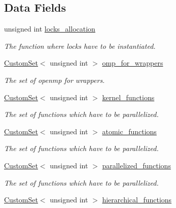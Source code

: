 \subsection*{Data Fields}
\begin{DoxyCompactItemize}
\item 
unsigned int \hyperlink{classOmpFunctions_a51202abb9e5888fbbbfe347b379e2e6a}{locks\+\_\+allocation}
\begin{DoxyCompactList}\small\item\em The function where locks have to be instantiated. \end{DoxyCompactList}\item 
\hyperlink{custom__set_8hpp_a615bc2f42fc38a4bb1790d12c759e86f}{Custom\+Set}$<$ unsigned int $>$ \hyperlink{classOmpFunctions_a17e7935fd31530460b887a825beea191}{omp\+\_\+for\+\_\+wrappers}
\begin{DoxyCompactList}\small\item\em The set of openmp for wrappers. \end{DoxyCompactList}\item 
\hyperlink{custom__set_8hpp_a615bc2f42fc38a4bb1790d12c759e86f}{Custom\+Set}$<$ unsigned int $>$ \hyperlink{classOmpFunctions_a2ed2c022afbba84efd566b61849b1e16}{kernel\+\_\+functions}
\begin{DoxyCompactList}\small\item\em The set of functions which have to be parallelized. \end{DoxyCompactList}\item 
\hyperlink{custom__set_8hpp_a615bc2f42fc38a4bb1790d12c759e86f}{Custom\+Set}$<$ unsigned int $>$ \hyperlink{classOmpFunctions_a05d19f13553c5517c1ae274cf5c844dd}{atomic\+\_\+functions}
\begin{DoxyCompactList}\small\item\em The set of functions which have to be parallelized. \end{DoxyCompactList}\item 
\hyperlink{custom__set_8hpp_a615bc2f42fc38a4bb1790d12c759e86f}{Custom\+Set}$<$ unsigned int $>$ \hyperlink{classOmpFunctions_a9035fe9e0b8711fe07c83ef7257728a0}{parallelized\+\_\+functions}
\begin{DoxyCompactList}\small\item\em The set of functions which have to be parallelized. \end{DoxyCompactList}\item 
\hyperlink{custom__set_8hpp_a615bc2f42fc38a4bb1790d12c759e86f}{Custom\+Set}$<$ unsigned int $>$ \hyperlink{classOmpFunctions_a38dce0236327c67af64c891d9c10a577}{hierarchical\+\_\+functions}

\end{DoxyCompactItemize}
